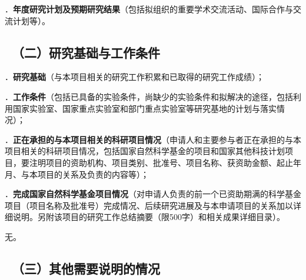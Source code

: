 \documentclass[12pt,UTF8,AutoFakeBold=3,a4paper]{ctexart} %
\newcommand{\sihao}{\fontsize{14pt}{\baselineskip}\selectfont}
\begin{document}



{\sihao \color{MsBlue} ．{\bfseries 年度研究计划及预期研究结果}（包括拟组织的重要学术交流活动、国际合作与交流计划等）。}





{\color{MsBlue} \subsection{\sihao \kaishu \quad \ （二）研究基础与工作条件 }}

{\sihao \color{MsBlue} ．{\bfseries 研究基础}（与本项目相关的研究工作积累和已取得的研究工作成绩）；}



\vspace{0.5 \baselineskip}
{\sihao \color{MsBlue} ．{\bfseries 工作条件}（包括已具备的实验条件，尚缺少的实验条件和拟解决的途径，包括利用国家实验室、国家重点实验室和部门重点实验室等研究基地的计划与落实情况）；}
\vspace{0.5 \baselineskip}



{\sihao \color{MsBlue} ．{\bfseries 正在承担的与本项目相关的科研项目情况}（申请人和主要参与者正在承担的与本项目相关的科研项目情况，包括国家自然科学基金的项目和国家其他科技计划项目，要注明项目的资助机构、项目类别、批准号、项目名称、获资助金额、起止年月、与本项目的关系及负责的内容等）；}



{\sihao \color{MsBlue} ．{\bfseries 完成国家自然科学基金项目情况}（对申请人负责的前一个已资助期满的科学基金项目（项目名称及批准号）完成情况、后续研究进展及与本申请项目的关系加以详细说明。另附该项目的研究工作总结摘要（限500字）和相关成果详细目录）。}

\vspace{0.25 \baselineskip}
{\kaishu 无。}

{\color{MsBlue} \subsection{\sihao \kaishu \quad \ （三）其他需要说明的情况 }}
\end{document}
